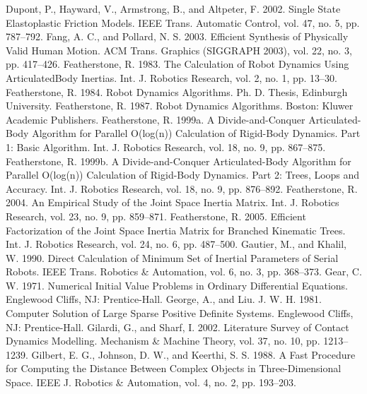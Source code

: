 Dupont, P., Hayward, V., Armstrong, B., and Altpeter, F. 2002. Single State Elastoplastic Friction Models. IEEE Trans. Automatic Control, vol. 47, no. 5, pp. 787–792. Fang, A. C., and Pollard, N. S. 2003. Efficient Synthesis of Physically Valid Human Motion. ACM Trans. Graphics (SIGGRAPH 2003), vol. 22, no. 3, pp. 417–426. Featherstone, R. 1983. The Calculation of Robot Dynamics Using ArticulatedBody Inertias. Int. J. Robotics Research, vol. 2, no. 1, pp. 13–30. Featherstone, R. 1984. Robot Dynamics Algorithms. Ph. D. Thesis, Edinburgh University. Featherstone, R. 1987. Robot Dynamics Algorithms. Boston: Kluwer Academic Publishers. Featherstone, R. 1999a. A Divide-and-Conquer Articulated-Body Algorithm for Parallel O(log(n)) Calculation of Rigid-Body Dynamics. Part 1: Basic Algorithm. Int. J. Robotics Research, vol. 18, no. 9, pp. 867–875. Featherstone, R. 1999b. A Divide-and-Conquer Articulated-Body Algorithm for Parallel O(log(n)) Calculation of Rigid-Body Dynamics. Part 2: Trees, Loops and Accuracy. Int. J. Robotics Research, vol. 18, no. 9, pp. 876–892. Featherstone, R. 2004. An Empirical Study of the Joint Space Inertia Matrix. Int. J. Robotics Research, vol. 23, no. 9, pp. 859–871. Featherstone, R. 2005. Efficient Factorization of the Joint Space Inertia Matrix for Branched Kinematic Trees. Int. J. Robotics Research, vol. 24, no. 6, pp. 487–500. Gautier, M., and Khalil, W. 1990. Direct Calculation of Minimum Set of Inertial Parameters of Serial Robots. IEEE Trans. Robotics \& Automation, vol. 6, no. 3, pp. 368–373. Gear, C. W. 1971. Numerical Initial Value Problems in Ordinary Differential Equations. Englewood Cliffs, NJ: Prentice-Hall. George, A., and Liu. J. W. H. 1981. Computer Solution of Large Sparse Positive Definite Systems. Englewood Cliffs, NJ: Prentice-Hall. Gilardi, G., and Sharf, I. 2002. Literature Survey of Contact Dynamics Modelling. Mechanism \& Machine Theory, vol. 37, no. 10, pp. 1213–1239. Gilbert, E. G., Johnson, D. W., and Keerthi, S. S. 1988. A Fast Procedure for Computing the Distance Between Complex Objects in Three-Dimensional Space. IEEE J. Robotics \& Automation, vol. 4, no. 2, pp. 193–203.

